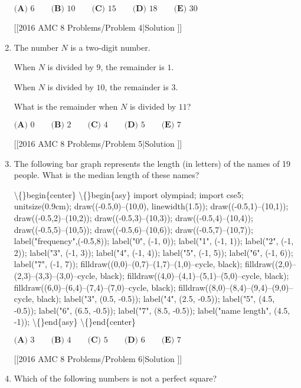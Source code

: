 \documentclass{article}
\begin{document}
\begin{enumerate}[label=\arabic*., itemsep=0.5em]
\(\textbf{(A) }6\qquad\textbf{(B) }10\qquad\textbf{(C) }15\qquad\textbf{(D) }18\qquad \textbf{(E) }30\)

[[2016 AMC 8 Problems/Problem 4|Solution
]]\par \vspace{0.5em}\item The number \(N\) is a two-digit number.

 When \(N\) is divided by \(9\), the remainder is \(1\).

 When \(N\) is divided by \(10\), the remainder is \(3\).

What is the remainder when \(N\) is divided by \(11\)?


\(\textbf{(A) }0\qquad\textbf{(B) }2\qquad\textbf{(C) }4\qquad\textbf{(D) }5\qquad \textbf{(E) }7\)

[[2016 AMC 8 Problems/Problem 5|Solution
]]\par \vspace{0.5em}\item The following bar graph represents the length (in letters) of the names of 19 people. What is the median length of these names?

\textbackslash\{\}begin\{center\}
\textbackslash\{\}begin\{asy\}
import olympiad;
import cse5;
unitsize(0.9cm);
draw((-0.5,0)--(10,0), linewidth(1.5));
draw((-0.5,1)--(10,1));
draw((-0.5,2)--(10,2));
draw((-0.5,3)--(10,3));
draw((-0.5,4)--(10,4));
draw((-0.5,5)--(10,5));
draw((-0.5,6)--(10,6));
draw((-0.5,7)--(10,7));
label("frequency",(-0.5,8));
label("0", (-1, 0));
label("1", (-1, 1));
label("2", (-1, 2));
label("3", (-1, 3));
label("4", (-1, 4));
label("5", (-1, 5));
label("6", (-1, 6));
label("7", (-1, 7));
filldraw((0,0)--(0,7)--(1,7)--(1,0)--cycle, black);
filldraw((2,0)--(2,3)--(3,3)--(3,0)--cycle, black);
filldraw((4,0)--(4,1)--(5,1)--(5,0)--cycle, black);
filldraw((6,0)--(6,4)--(7,4)--(7,0)--cycle, black);
filldraw((8,0)--(8,4)--(9,4)--(9,0)--cycle, black);
label("3", (0.5, -0.5));
label("4", (2.5, -0.5));
label("5", (4.5, -0.5));
label("6", (6.5, -0.5));
label("7", (8.5, -0.5));
label("name length", (4.5, -1));
\textbackslash\{\}end\{asy\}
\textbackslash\{\}end\{center\}


\(\textbf{(A) }3\qquad\textbf{(B) }4\qquad\textbf{(C) }5\qquad\textbf{(D) }6\qquad \textbf{(E) }7\)

[[2016 AMC 8 Problems/Problem 6|Solution
]]\par \vspace{0.5em}\item Which of the following numbers is not a perfect square?


\end{enumerate}
\end{document}
